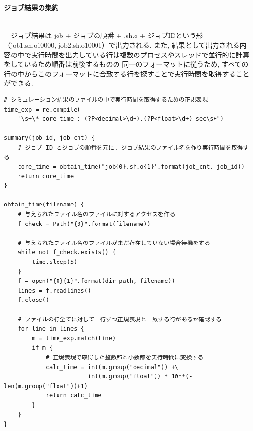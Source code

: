 \paragraph{ジョブ結果の集約}~\\
　ジョブ結果は job + ジョブの順番 + .sh.o + ジョブIDという形（job1.sh.o10000, job2.sh.o10001）で出力される.
また, 結果として出力される内容の中で実行時間を出力している行は複数のプロセスやスレッドで並行的に計算をしているため順番は前後するものの
同一のフォーマットに従うため, すべての行の中からこのフォーマットに合致する行を探すことで実行時間を取得することができる.\\
{\footnotesize
\begin{lstlisting}[title=ジョブ結果の集約　疑似コード, frame=single]
# シミュレーション結果のファイルの中で実行時間を取得するための正規表現
time_exp = re.compile(
    "\s+\* core time : (?P<decimal>\d+).(?P<float>\d+) sec\s+")

summary(job_id, job_cnt) {
    # ジョブ ID とジョブの順番を元に, ジョブ結果のファイル名を作り実行時間を取得する
    core_time = obtain_time("job{0}.sh.o{1}".format(job_cnt, job_id))
    return core_time
}

obtain_time(filename) {
    # 与えられたファイル名のファイルに対するアクセスを作る
    f_check = Path("{0}".format(filename))

    # 与えられたファイル名のファイルがまだ存在していない場合待機をする
    while not f_check.exists() {
        time.sleep(5)
    }
    f = open("{0}{1}".format(dir_path, filename))
    lines = f.readlines()
    f.close()

    # ファイルの行全てに対して一行ずつ正規表現と一致する行があるか確認する
    for line in lines {
        m = time_exp.match(line)
        if m {
            # 正規表現で取得した整数部と小数部を実行時間に変換する
            calc_time = int(m.group("decimal")) +\
                        int(m.group("float")) * 10**(-len(m.group("float"))+1)
            return calc_time
        }
    }
}
\end{lstlisting}
}

